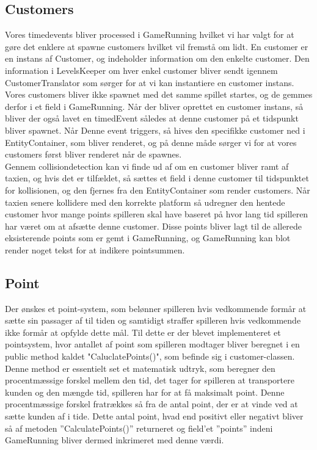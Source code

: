 \subsection{Customers}
   Vores timedevents bliver processed i GameRunning hvilket vi har valgt for at gøre det enklere at spawne customers hvilket vil fremstå om lidt. En customer er en instans af Customer, og indeholder information om den enkelte customer. Den information i LevelsKeeper om hver enkel customer bliver sendt igennem CustomerTranslator som sørger for at vi kan instantiere en customer instans. Vores customers bliver ikke spawnet med det samme spillet startes, og de gemmes derfor i et field i GameRunning. Når der bliver oprettet en customer instans, så bliver der også lavet en timedEvent således at denne customer på et tidspunkt bliver spawnet. Når Denne event triggers, så hives den specifikke customer ned i EntityContainer, som bliver renderet, og på denne måde sørger vi for at vores customers først bliver renderet når de spawnes.\\
   Gennem collisiondetection kan vi finde ud af om en customer bliver ramt af taxien, og hvis det er tilfældet, så sættes et field i denne customer til tidspunktet for kollisionen, og den fjernes fra den EntityContainer som render customers. Når taxien senere kollidere med den korrekte platform så udregner den hentede customer hvor mange points spilleren skal have baseret på hvor lang tid spilleren har været om at afsætte denne customer. Disse points bliver lagt til de allerede eksisterende points som er gemt i GameRunning, og GameRunning kan blot render noget tekst for at indikere pointsummen.

   \subsection{Point}
   Der ønskes et point-system, som belønner spilleren hvis vedkommende formår at sætte sin passager af til tiden og samtidigt straffer spilleren hvis vedkommende ikke formår at opfylde dette mål.
   Til dette er der blevet implementeret et pointsystem, hvor antallet af point som spilleren modtager bliver beregnet i en public method kaldet "CaluclatePoints()", som befinde sig i customer-classen.
   Denne method er essentielt set et matematisk udtryk, som beregner den procentmæssige forskel mellem den tid, det tager for spilleren at transportere kunden og den mængde tid, spilleren har for at få maksimalt point. Denne procentmæssige forskel fratrækkes så fra de antal point, der er at vinde ved at sætte kunden af i tide.
   Dette antal point, hvad end positivt eller negativt bliver så af metoden ''CalculatePoints()'' returneret og field'et ''points'' indeni GameRunning bliver dermed inkrimeret med denne værdi.
   

